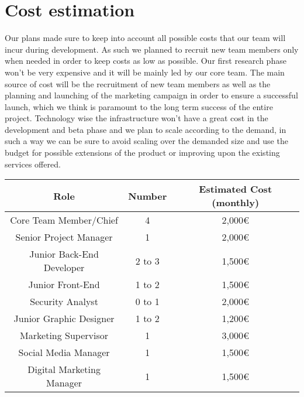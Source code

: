 \chapter{Cost estimation}%
\label{chap:costEstimation}
Our plans made sure to keep into account all possible costs that our team will incur during development. As such we planned to recruit new team members only when needed in order to keep costs as low as possible. Our first research phase won’t be very expensive and it will be mainly led by our core team. The main source of cost will be the recruitment of new team members as well as the planning and launching of the marketing campaign in order to ensure a successful launch, which we think is paramount to the long term success of the entire project.
Technology wise the infrastructure won’t have a great cost in the development and beta phase and we plan to scale according to the demand, in such a way we can be sure to avoid scaling over the demanded size and use the budget for possible extensions of the product or improving upon the existing services offered.\\

\begin{table}[h]
    \centering
\begin{tabular}{ccc}
    \toprule
    Role & Number & Estimated Cost (monthly)\\ \midrule
    Core Team Member/Chief & 4 & 2,000€\\ \midrule
    Senior Project Manager & 1 & 2,000€\\  \midrule
    Junior Back-End Developer & 2 to 3 & 1,500€\\  \midrule
    Junior Front-End & 1 to 2 & 1,500€\\  \midrule
    Security Analyst & 0 to 1 & 2,000€\\  \midrule
    Junior Graphic Designer & 1 to 2 & 1,200€\\  \midrule
    Marketing Supervisor & 1 & 3,000€\\ \midrule
    Social Media Manager & 1 & 1,500€\\ \midrule
    Digital Marketing Manager & 1 & 1,500€\\ 
    \bottomrule
\end{tabular}
\end{table}
